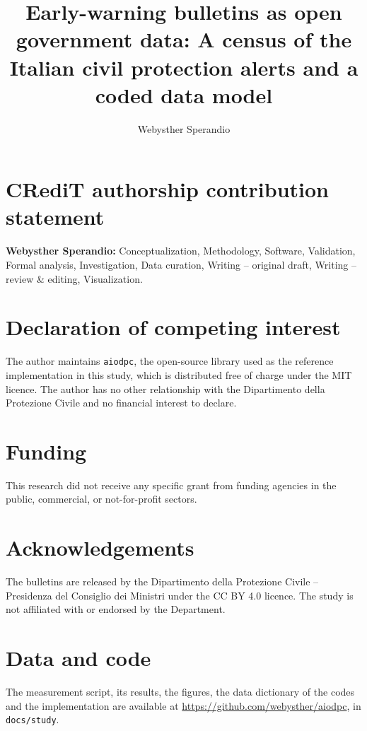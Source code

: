 \documentclass[preprint,12pt]{elsarticle}
\begin{document}
\begin{frontmatter}

\title{Early-warning bulletins as open government data: A census of the
Italian civil protection alerts and a coded data model}

\author{Webysther Sperandio}

\end{frontmatter}

\section*{CRediT authorship contribution statement}

\textbf{Webysther Sperandio:} Conceptualization, Methodology, Software,
Validation, Formal analysis, Investigation, Data curation, Writing -- original
draft, Writing -- review \& editing, Visualization.

\section*{Declaration of competing interest}

The author maintains \texttt{aiodpc}, the open-source library used as the
reference implementation in this study, which is distributed free of charge
under the MIT licence. The author has no other relationship with the
Dipartimento della Protezione Civile and no financial interest to declare.

\section*{Funding}

This research did not receive any specific grant from funding agencies in the
public, commercial, or not-for-profit sectors.

\section*{Acknowledgements}

The bulletins are released by the Dipartimento della Protezione Civile --
Presidenza del Consiglio dei Ministri under the CC BY 4.0 licence. The study is
not affiliated with or endorsed by the Department.

\section*{Data and code}

The measurement script, its results, the figures, the data dictionary of the
codes and the implementation are available at
\url{https://github.com/webysther/aiodpc}, in \texttt{docs/study}.
\end{document}
